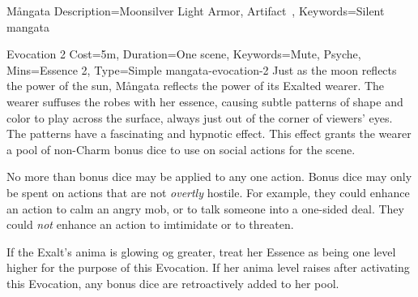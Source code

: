 \begin{Merit}{Mångata}{
    Description={Moonsilver Light Armor, Artifact~},
    Keywords=Silent
}{mangata}
\begin{Charm}{Evocation 2}{
    Cost=5m,
    Duration=One scene,
    Keywords={Mute, Psyche},
    Mins=Essence 2,
    Type=Simple
}{mangata-evocation-2}
    Just as the moon reflects the power of the sun, Mångata reflects the power
    of its Exalted wearer. The wearer suffuses the robes with her essence,
    causing subtle patterns of shape and color to play across the surface,
    always just out of the corner of viewers' eyes. The patterns have a
    fascinating and hypnotic effect. This effect grants the wearer a pool of
     non-Charm bonus dice to use on
    social actions for the scene.

    No more than  bonus dice may be applied to any one
    action. Bonus dice may only be spent on actions that are not \emph{overtly}
    hostile. For example, they could enhance an action to calm an angry mob, or
    to talk someone into a one-sided deal. They could \emph{not} enhance an
    action to imtimidate or to threaten.

    If the Exalt's anima is glowing og greater, treat her Essence as being one
    level higher for the purpose of this Evocation. If her anima level raises
    after activating this Evocation, any bonus dice are retroactively added to
    her pool.
\end{Charm}
\end{Merit}

